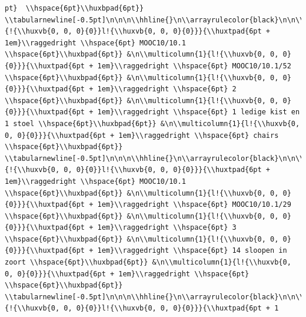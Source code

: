 \documentclass[11pt,preprint, authoryear]{elsarticle}
\numberwithin{equation}{section}
\numberwithin{figure}{section}
\numberwithin{table}{section}
\begin{document}
\begin{verbatim}
pt}  \\hspace{6pt}\\huxbpad{6pt}} \\tabularnewline[-0.5pt]\n\n\n\\hhline{}\n\\arrayrulecolor{black}\n\n\\multicolumn{1}{!{\\huxvb{0, 0, 0}{0}}l!{\\huxvb{0, 0, 0}{0}}}{\\huxtpad{6pt + 1em}\\raggedright \\hspace{6pt} MOOC10/10.1 \\hspace{6pt}\\huxbpad{6pt}} &\n\\multicolumn{1}{l!{\\huxvb{0, 0, 0}{0}}}{\\huxtpad{6pt + 1em}\\raggedright \\hspace{6pt} MOOC10/10.1/52 \\hspace{6pt}\\huxbpad{6pt}} &\n\\multicolumn{1}{l!{\\huxvb{0, 0, 0}{0}}}{\\huxtpad{6pt + 1em}\\raggedright \\hspace{6pt} 2 \\hspace{6pt}\\huxbpad{6pt}} &\n\\multicolumn{1}{l!{\\huxvb{0, 0, 0}{0}}}{\\huxtpad{6pt + 1em}\\raggedright \\hspace{6pt} 1 ledige kist en 1 stoel \\hspace{6pt}\\huxbpad{6pt}} &\n\\multicolumn{1}{l!{\\huxvb{0, 0, 0}{0}}}{\\huxtpad{6pt + 1em}\\raggedright \\hspace{6pt} chairs \\hspace{6pt}\\huxbpad{6pt}} \\tabularnewline[-0.5pt]\n\n\n\\hhline{}\n\\arrayrulecolor{black}\n\n\\multicolumn{1}{!{\\huxvb{0, 0, 0}{0}}l!{\\huxvb{0, 0, 0}{0}}}{\\huxtpad{6pt + 1em}\\raggedright \\hspace{6pt} MOOC10/10.1 \\hspace{6pt}\\huxbpad{6pt}} &\n\\multicolumn{1}{l!{\\huxvb{0, 0, 0}{0}}}{\\huxtpad{6pt + 1em}\\raggedright \\hspace{6pt} MOOC10/10.1/29 \\hspace{6pt}\\huxbpad{6pt}} &\n\\multicolumn{1}{l!{\\huxvb{0, 0, 0}{0}}}{\\huxtpad{6pt + 1em}\\raggedright \\hspace{6pt} 3 \\hspace{6pt}\\huxbpad{6pt}} &\n\\multicolumn{1}{l!{\\huxvb{0, 0, 0}{0}}}{\\huxtpad{6pt + 1em}\\raggedright \\hspace{6pt} 14 sloopen in zoort \\hspace{6pt}\\huxbpad{6pt}} &\n\\multicolumn{1}{l!{\\huxvb{0, 0, 0}{0}}}{\\huxtpad{6pt + 1em}\\raggedright \\hspace{6pt}  \\hspace{6pt}\\huxbpad{6pt}} \\tabularnewline[-0.5pt]\n\n\n\\hhline{}\n\\arrayrulecolor{black}\n\n\\multicolumn{1}{!{\\huxvb{0, 0, 0}{0}}l!{\\huxvb{0, 0, 0}{0}}}{\\huxtpad{6pt + 1
\end{verbatim}
\end{document}
